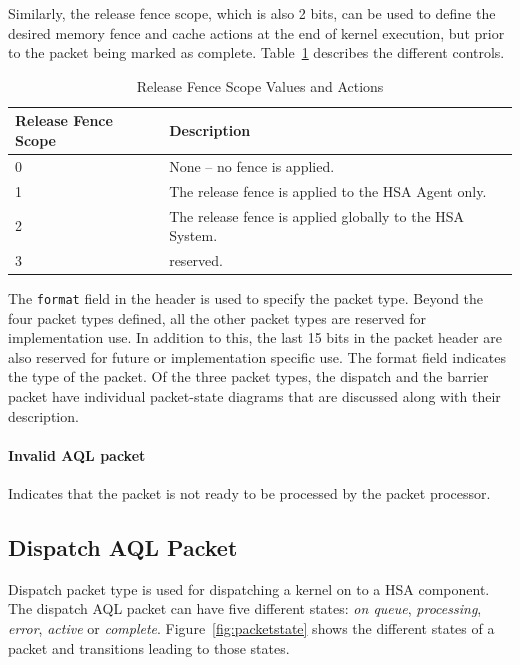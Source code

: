 \documentclass{book}
\begin{document}
Similarly, the release fence scope, which is also 2 bits, can be
used to define the desired memory fence and cache actions at the
end of kernel execution, but prior to the packet being marked as
complete. Table~\ref{releasefencescope} describes the different
controls.

\begin{table}
  \begin{center}
          \begin{tabular}{|p{1in}|p{5in}|}
      \hline
      \textbf{Release Fence Scope} &\textbf{Description} \\
      \hline
      0	& None -- no fence is applied. \\
      \hline
      1	& The release fence is applied to the HSA Agent only. \\
      \hline
      2	& The release fence is applied globally to the HSA System.\\
      \hline
      3	& reserved. \\
      \hline
    \end{tabular}
  \end{center}
  \caption{Release Fence Scope Values and Actions}
  \label{releasefencescope}
\end{table}

The \texttt{format} field in the header is used to specify
the packet type. Beyond the four packet types defined, all the
other packet types are reserved for implementation use. In addition
to this, the last 15 bits in the packet header are also reserved for
future or implementation specific use. The format field indicates
the type of the packet. Of the three packet types, the
dispatch and the barrier packet have individual packet-state
diagrams that are discussed along with their description.

\paragraph{Invalid AQL packet} Indicates that the packet is not ready
to be processed by the packet processor.

\hypertarget{dispatch_packet}{}\subsection{Dispatch AQL
Packet}\label{dispatch_packet}

Dispatch packet type is used for dispatching a kernel on to a HSA
component. The dispatch AQL packet can have five different states:
\emph{on queue}, \emph{processing}, \emph{error}, \emph{active} or
\emph{complete}. Figure~\ref{fig:packetstate} shows the different
states of a packet and transitions leading to those states.
\end{document}
